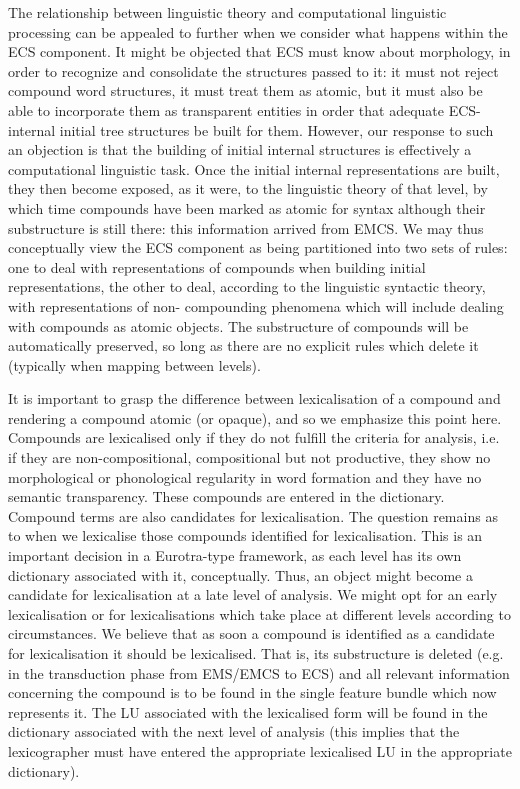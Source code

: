 The  relationship  between linguistic  theory  and  computational 
linguistic processing can be appealed to further when we consider 
what happens within the ECS component.  It might be objected that 
ECS  must  know  about  morphology,  in order  to  recognize  and 
consolidate  the  structures passed to it:  it  must  not  reject 
compound  word structures,  it must treat them as atomic,  but it 
must also be able to incorporate them as transparent entities  in 
order that adequate ECS-internal initial tree structures be built 
for them.  However, our response to such an objection is that the 
building   of  initial  internal  structures  is  effectively   a 
computational   linguistic  task.   Once  the  initial   internal 
representations are built,  they then become exposed, as it were, 
to  the linguistic theory of that level,  by which time compounds 
have been marked as atomic for syntax although their substructure 
is still there:  this information arrived from EMCS.  We may thus 
conceptually view the ECS component as being partitioned into two 
sets of rules: one to deal with representations of compounds when 
building initial representations, the other to deal, according to 
the  linguistic  syntactic theory,  with representations of  non-
compounding  phenomena which will include dealing with  compounds 
as  atomic  objects.   The  substructure  of  compounds  will  be 
automatically preserved,  so long as there are no explicit  rules 
which delete it (typically when mapping between levels).


It  is important  to  grasp the difference between lexicalisation  
of   a  compound  and  rendering a compound atomic  (or  opaque),  
and so we  emphasize this point here.   Compounds are lexicalised 
only if they do  not fulfill  the  criteria  for  analysis,  i.e.  
if   they   are   non-compositional,    compositional   but   not 
productive,    they  show   no  morphological   or   phonological 
regularity   in  word  formation   and  they  have  no   semantic 
transparency.   These compounds are  entered in  the  dictionary.  
Compound  terms  are  also  candidates  for  lexicalisation.  The 
question  remains  as  to when   we lexicalise   those  compounds 
identified for  lexicalisation.  This is an important decision in 
a  Eurotra-type framework,  as each level has its own  dictionary 
associated with it,  conceptually. Thus, an object might become a 
candidate  for lexicalisation at a late level  of  analysis.   We 
might  opt  for  an early lexicalisation or  for  lexicalisations 
which  take place at different levels according to circumstances. 
We  believe  that  as  soon a  compound   is  identified   as   a  
candidate  for  lexicalisation  it  should  be lexicalised.  That 
is,  its substructure is deleted (e.g.  in the transduction phase 
from EMS/EMCS to ECS) and all relevant information concerning the 
compound  is to be found in the single feature bundle  which  now 
represents it.   The  LU associated  with  the  lexicalised  form 
will   be   found   in  the dictionary associated with  the  next 
level of analysis (this implies that the lexicographer must  have 
entered   the  appropriate  lexicalised  LU  in  the  appropriate 
dictionary).

